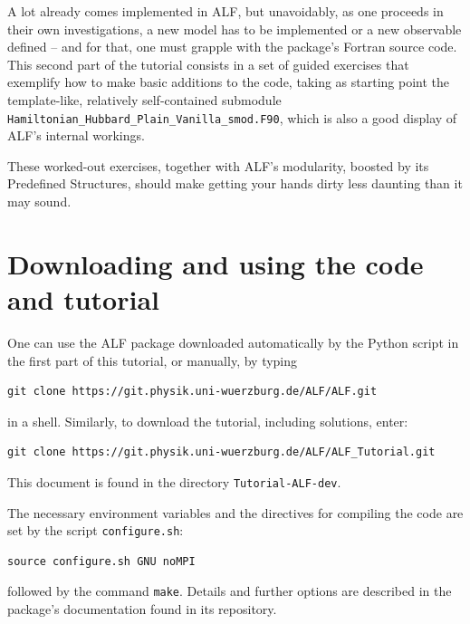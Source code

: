 \documentclass[10pt,modern]{scrartcl}
\numberwithin{exerciseitem}{exercise} %
\newcommand{\tutALFver}{dev}       %
\begin{document}
A lot already comes implemented in ALF, but unavoidably, as one proceeds in their own investigations, a new model has to be implemented or a new observable defined -- and for that, one must grapple with the package's Fortran source code. 
This second part of the tutorial consists in a set of guided exercises that exemplify how to make basic additions to the code, taking as starting point the template-like, relatively self-contained submodule \texttt{Hamiltonian\_Hubbard\_Plain\_Vanilla\_smod.F90}, which is also a good display of ALF's internal workings.

These worked-out exercises, together with ALF's modularity, boosted by its Predefined Structures, should make getting your hands dirty less daunting than it may sound.


\section*{Downloading and using the code and tutorial}
One can use the ALF package downloaded automatically by the Python script in the first part of this tutorial, or manually, by typing
\begin{lstlisting}[style=bash]
git clone https://git.physik.uni-wuerzburg.de/ALF/ALF.git
\end{lstlisting}
in a shell. Similarly, to download the tutorial, including solutions, enter:
\begin{lstlisting}[style=bash]
git clone https://git.physik.uni-wuerzburg.de/ALF/ALF_Tutorial.git
\end{lstlisting}
This document is found in the directory \texttt{Tutorial-ALF-\tutALFver{}}.

The necessary environment variables and the directives for compiling the code are set by the script \texttt{configure.sh}:
\begin{lstlisting}[style=bash]
source configure.sh GNU noMPI
\end{lstlisting}
followed by the command \lstinline[style=bash,morekeywords={make}]|make|. Details and further options are described in the package's documentation found in its repository.
\end{document}
